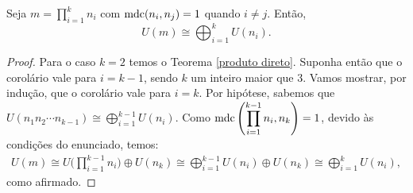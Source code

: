 	\begin{corollary}
	\label{produto direto de U(m)}
		Seja $\displaystyle{m = \prod_{i = 1}^{k}n_i}$ com 
		$\operatorname{mdc}(n_i, n_j) = 1$ quando $i\neq j$. Então,
		\[
		\displaystyle{U(m)\cong\bigoplus_{i = 1}^{k} U(n_i)}.
		\]
	\end{corollary}
	\begin{proof}
		Para o caso $k = 2$ temos o Teorema \ref{produto direto}. Suponha então que o corolário 
		vale para $i = k-1$, sendo $k$ um inteiro maior que 3. Vamos mostrar, por indução, que o 
		corolário vale para $i = k$.
		Por hipótese, sabemos que $U(n_1n_2\cdots n_{k-1})\cong \displaystyle{\bigoplus_{i=1}^{k-1}U(n_i)}$. 
		Como $\operatorname{mdc} \Bigg(\displaystyle{ \prod_{i=1}^{k-1}n_i }, n_k\Bigg) = 1$, devido às condições do 
		enunciado, temos:
		\begin{align*}
		U(m) \cong U\Bigg(\displaystyle{\prod_{i=1}^{k-1}n_i}\Bigg)\oplus U(n_k)
		     \cong \bigoplus_{i=1}^{k-1}U(n_i)\oplus U(n_k)
		     \cong \bigoplus_{i=1}^{k}U(n_i),
		\end{align*}
		como afirmado.
	\end{proof}

